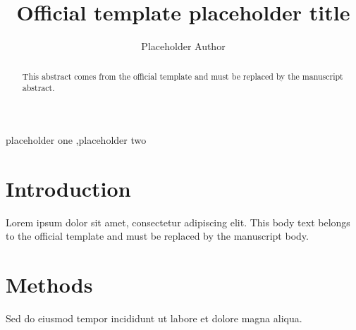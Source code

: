 \documentclass[preprint,12pt]{myjournal}
\begin{document}
\begin{frontmatter}

\title{Official template placeholder title}

\author[1]{Placeholder Author}

\begin{abstract}
This abstract comes from the official template and must be replaced by the
manuscript abstract.
\end{abstract}

\begin{keyword}
placeholder one \sep placeholder two
\end{keyword}

\end{frontmatter}

\section{Introduction}
Lorem ipsum dolor sit amet, consectetur adipiscing elit. This body text belongs
to the official template and must be replaced by the manuscript body.

\section{Methods}
Sed do eiusmod tempor incididunt ut labore et dolore magna aliqua.



\end{document}
